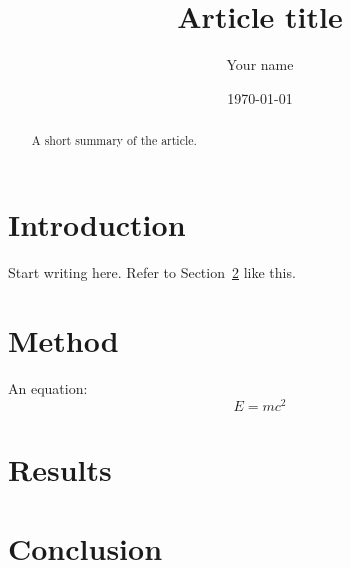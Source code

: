 \documentclass[11pt]{article}
\title{Article title}
\author{Your name}
\date{\today}
\begin{document}
\maketitle

\begin{abstract}
A short summary of the article.
\end{abstract}

\section{Introduction}
\label{sec:introduction}

Start writing here. Refer to Section~\ref{sec:method} like this.

\section{Method}
\label{sec:method}

An equation:
\begin{equation}
  E = mc^2
  \label{eq:energy}
\end{equation}

\section{Results}

\section{Conclusion}
\end{document}
